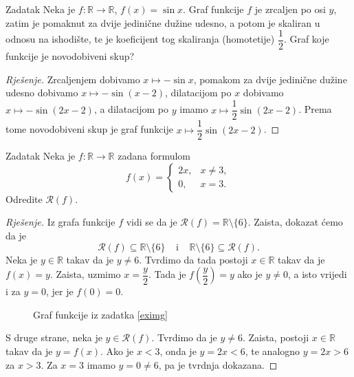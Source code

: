 \begin{exercise}{Zadatak} Neka je \(f : \mathbb{R}\to \mathbb{R}\), \(f(x)=\sin{x}\). Graf funkcije \(f\) je zrcaljen po osi \(y\), zatim je pomaknut za dvije jedinične dužine udesno, a potom je skaliran u odnosu na ishodište, te je koeficijent tog skaliranja (homotetije) \(\dfrac{1}{2}\). Graf koje funkcije je novodobiveni skup?
\end{exercise}
\begin{proof}[Rješenje]
Zrcaljenjem dobivamo \(x\mapsto -\sin{x}\), pomakom za dvije jedinične dužine udesno dobivamo \(x\mapsto -\sin(x-2)\), dilatacijom po \(x\) dobivamo \(x\mapsto -\sin\left(2x-2\right)\), a dilatacijom po \(y\) imamo \(x\mapsto \dfrac{1}{2}\sin(2x-2)\). Prema tome novodobiveni skup je graf funkcije \(x\mapsto \dfrac{1}{2}\sin(2x-2)\).
\end{proof}
\begin{exercise}{Zadatak}
\label{eximg}
Neka je \(f : \mathbb{R}\to \mathbb{R}\) zadana formulom
\[f(x)=\begin{cases}
2x, & x\neq 3, \\
0, & x=3.
   \end{cases}\]
Odredite \(\mathcal{R}(f)\).
\end{exercise}
\begin{proof}[Rješenje]
Iz grafa funkcije \(f\) vidi se da je \(\mathcal{R}(f)=\mathbb{R}\setminus \{6\}\). Zaista, dokazat ćemo da je \[\mathcal{R}(f)\subseteq \mathbb{R}\setminus \{6\}\;\;\;\;\text{i}\;\;\;\;\mathbb{R}\setminus \{6\}\subseteq \mathcal{R}(f).\]
Neka je \(y\in \mathbb{R}\) takav da je \(y\neq 6\). Tvrdimo da tada postoji \(x\in \mathbb{R}\) takav da je \(f(x)=y\). Zaista, uzmimo \(x=\dfrac{y}{2}\). Tada je \(f\left(\dfrac{y}{2}\right)=y\) ako je \(y\neq 0\), a isto vrijedi i za \(y=0\), jer je \(f(0)=0\).
\begin{figure}[ht]
\begin{center}
\end{center}
\caption{\label{exim1} Graf funkcije iz zadatka \ref{eximg}}
\end{figure}

S druge strane, neka je \(y\in \mathcal{R}(f)\). Tvrdimo da je \(y\neq 6\). Zaista, postoji \(x\in \mathbb{R}\) takav da je \(y=f(x)\). Ako je \(x<3\), onda je \(y=2x<6\), te analogno \(y=2x>6\) za \(x>3\). Za \(x=3\) imamo \(y=0\neq 6\), pa je tvrdnja dokazana.
\end{proof}
